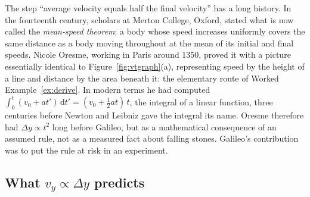 \documentclass[11pt,twoside,openany]{book}
\newcommand{\dd}{\mathrm{d}}
\begin{document}
\begin{modelnote}
The step ``average velocity equals half the final velocity'' has a long history. In the fourteenth century, scholars at Merton College, Oxford, stated what is now called the \emph{mean-speed theorem}: a body whose speed increases uniformly covers the same distance as a body moving throughout at the mean of its initial and final speeds. Nicole Oresme, working in Paris around 1350, proved it with a picture essentially identical to Figure~\ref{fig:vtgraph}(a), representing speed by the height of a line and distance by the area beneath it: the elementary route of Worked Example~\ref{ex:derive}. In modern terms he had computed $\int_0^t (v_0 + a t')\,\dd t' = (v_0 + \tfrac12 a t)\,t$, the integral of a linear function, three centuries before Newton and Leibniz gave the integral its name. Oresme therefore had $\Delta y \propto t^2$ long before Galileo, but as a mathematical consequence of an assumed rule, not as a measured fact about falling stones. Galileo's contribution was to put the rule at risk in an experiment.
\end{modelnote}

\subsection{What \texorpdfstring{$v_y \propto \Delta y$}{v proportional to distance} predicts}
\end{document}
